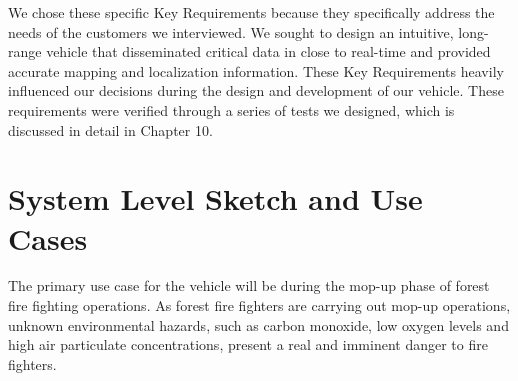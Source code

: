 We chose these specific Key Requirements because they specifically address the needs of the customers we interviewed. We sought to design an intuitive,  long-range vehicle that disseminated critical data in close to real-time and provided accurate mapping and localization information. These Key Requirements heavily influenced our decisions during the design and development of our vehicle. These requirements were verified through a series of tests we designed, which is discussed in detail in Chapter 10. 
%
\section{System Level Sketch and Use Cases}
The primary use case for the vehicle will be during the mop-up phase of forest fire fighting operations. As forest fire fighters are carrying out mop-up operations, unknown environmental hazards, such as carbon monoxide, low oxygen levels and high air particulate concentrations,  present a real and imminent danger to fire fighters. 

